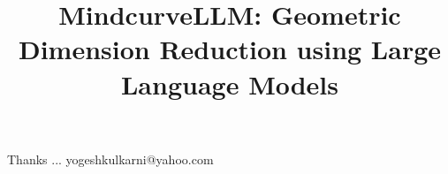 \documentclass[xcolor=dvipsnames,compress,t,pdf,9pt]{beamer}
\title[\insertframenumber /\inserttotalframenumber]{MindcurveLLM: Geometric Dimension Reduction using Large Language Models}
\subtitle[]{}
\begin{document}
	\begin{frame}
	\titlepage
%
	\end{frame}
	
%	
	
	
	\begin{frame}[c]{}
	Thanks ...
	\vspace{5mm}
	yogeshkulkarni@yahoo.com
	\end{frame}
\end{document}
